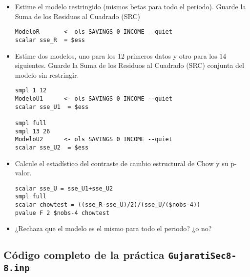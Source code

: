 \documentclass[11pt]{article}
\begin{document}
\begin{itemize}
\item Estime el modelo restringido (mismos betas para todo el
periodo). Guarde la Suma de los Residuos al Cuadrado (SRC)
\begin{verbatim}
ModeloR       <- ols SAVINGS 0 INCOME --quiet
scalar sse_R  = $ess
\end{verbatim}

\item Estime dos modelos, uno para los 12 primeros datos y otro para los
14 siguientes. Guarde la Suma de los Residuos al Cuadrado (SRC)
conjunta del modelo sin restringir.
\begin{verbatim}
smpl 1 12
ModeloU1      <- ols SAVINGS 0 INCOME --quiet
scalar sse_U1  = $ess

smpl full
smpl 13 26
ModeloU2      <- ols SAVINGS 0 INCOME --quiet
scalar sse_U2  = $ess
\end{verbatim}

\item Calcule el estadístico del contraste de cambio estructural de Chow y
su p-valor.
\begin{verbatim}
scalar sse_U = sse_U1+sse_U2
smpl full
scalar chowtest = ((sse_R-sse_U)/2)/(sse_U/($nobs-4))
pvalue F 2 $nobs-4 chowtest
\end{verbatim}

\item ¿Rechaza que el modelo es el mismo para todo el periodo? ¿o no?
\end{itemize}


\clearpage
\vspace{10pt}
\noindent
\subsection{Código completo de la práctica \texttt{GujaratiSec8-8.inp}}
\label{sec:orgb2b398d}
\vspace{10pt}

\clearpage
\end{document}

